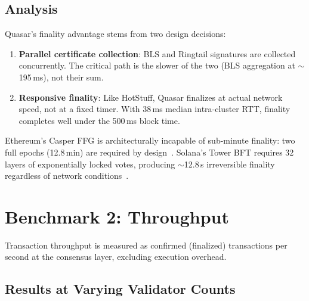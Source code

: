 \documentclass[11pt]{article}
\begin{document}
\subsection{Analysis}

Quasar's finality advantage stems from two design decisions:

\begin{enumerate}
\item \textbf{Parallel certificate collection}: BLS and Ringtail signatures are collected
      concurrently. The critical path is the slower of the two (BLS aggregation at
      $\sim$195\,ms), not their sum.
\item \textbf{Responsive finality}: Like HotStuff, Quasar finalizes at actual network
      speed, not at a fixed timer. With 38\,ms median intra-cluster RTT, finality
      completes well under the 500\,ms block time.
\end{enumerate}

Ethereum's Casper FFG is architecturally incapable of sub-minute finality: two full
epochs (12.8\,min) are required by design~\cite{casper-ffg}. Solana's Tower BFT
requires 32 layers of exponentially locked votes, producing $\sim$12.8\,s irreversible
finality regardless of network conditions~\cite{solana-wp}.

\section{Benchmark 2: Throughput}
\label{sec:throughput}

Transaction throughput is measured as confirmed (finalized) transactions per second at
the consensus layer, excluding execution overhead.

\subsection{Results at Varying Validator Counts}
\end{document}
